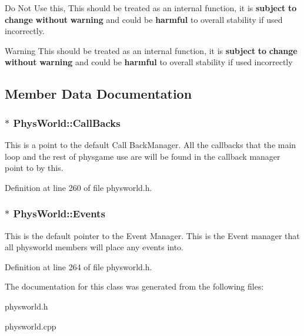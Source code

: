 Do Not Use this, This should be treated as an internal function, it is {\bfseries subject} {\bfseries to} {\bfseries change} {\bfseries without} {\bfseries warning} and could be {\bfseries harmful} to overall stability if used incorrectly. \begin{DoxyWarning}{Warning}
This should be treated as an internal function, it is {\bfseries subject} {\bfseries to} {\bfseries change} {\bfseries without} {\bfseries warning} and could be {\bfseries harmful} to overall stability if used incorrectly 
\end{DoxyWarning}


\subsection{Member Data Documentation}
\hypertarget{classPhysWorld_a080ea6f1584374b07d3c1f29c7ed64df}{
\subsubsection[{CallBacks}]{$\ast$ {\bf PhysWorld::CallBacks}}}
\label{db/df5/classPhysWorld_a080ea6f1584374b07d3c1f29c7ed64df}


This is a point to the default Call BackManager. All the callbacks that the main loop and the rest of physgame use are will be found in the callback manager point to by this. 

Definition at line 260 of file physworld.h.\hypertarget{classPhysWorld_a601b3c6093aaf2a69fcd3311dde9aadc}{
\subsubsection[{Events}]{$\ast$ {\bf PhysWorld::Events}}}
\label{db/df5/classPhysWorld_a601b3c6093aaf2a69fcd3311dde9aadc}


This is the default pointer to the Event Manager. This is the Event manager that all physworld members will place any events into. 

Definition at line 264 of file physworld.h.

The documentation for this class was generated from the following files:\begin{DoxyCompactItemize}
\item 
physworld.h\item 
physworld.cpp\end{DoxyCompactItemize}
